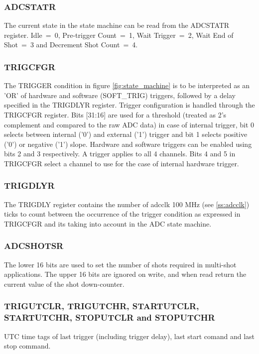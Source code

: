 \documentclass{article}
\begin{document}
\subsubsection{ADCSTATR}
The current state in the state machine can be read from the ADCSTATR register. Idle~=~0, Pre-trigger Count~=~1, Wait Trigger~=~2, Wait End of Shot~=~3 and Decrement Shot Count~=~4.

\subsubsection{TRIGCFGR}
The TRIGGER condition in figure \ref{fig:state_machine} is to be interpreted as an 'OR' of hardware and software (SOFT\_TRIG) triggers, followed by a delay specified in the TRIGDLYR register. Trigger configuration is handled through the TRIGCFGR register. Bits [31:16] are used for a threshold (treated as 2's complement and compared to the raw ADC data) in case of internal trigger, bit 0 selects between internal ('0') and external ('1') trigger and bit 1 selects positive ('0') or negative ('1') slope. Hardware and software triggers can be enabled using bits 2 and 3 respectively. A trigger applies to all 4 channels. Bits 4 and 5 in TRIGCFGR select a channel to use for the case of internal hardware trigger.  

\subsubsection{TRIGDLYR}
The TRIGDLY register contains the number of adcclk 100 MHz (see \ref{ss:adcclk}) ticks to count between the occurrence of the trigger condition as expressed in TRIGCFGR and its taking into account in the ADC state machine. 

\subsubsection{ADCSHOTSR}
The lower 16 bits are used to set the number of shots required in multi-shot applications. The upper 16 bits are ignored on write, and when read return the current value of the shot down-counter.

\subsubsection{TRIGUTCLR, TRIGUTCHR, STARTUTCLR, \\STARTUTCHR, STOPUTCLR and STOPUTCHR}
UTC time tags of last trigger (including trigger delay), last start comand and last stop command.
\end{document}
